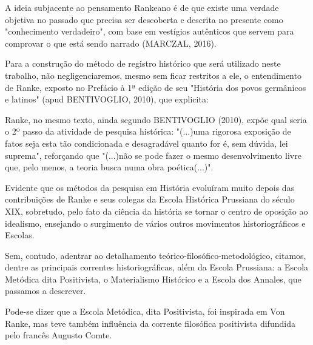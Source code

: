 A ideia subjacente ao pensamento Rankeano é de que existe uma verdade objetiva no passado que precisa ser descoberta e descrita no presente como "conhecimento verdadeiro", com base em vestígios autênticos que servem para comprovar o que está sendo narrado (MARCZAL, 2016).

Para a construção do método de registro histórico que será utilizado neste trabalho, não negligenciaremos, mesmo sem ficar restritos a ele, o entendimento de Ranke, exposto no Prefácio à 1ª edição de seu "História dos povos germânicos e latinos"  (apud BENTIVOGLIO, 2010), que explicita:


\noindent\begin{flushright}\mbox{\linespread{1}\selectfont\centering{}}\end{flushright}


Ranke, no mesmo texto, ainda segundo  BENTIVOGLIO (2010), expõe qual seria o 2º passo da atividade de pesquisa histórica: "(...)uma rigorosa exposição de fatos seja esta tão condicionada e desagradável quanto for é, sem dúvida, lei suprema", reforçando que "(...)não se pode fazer o mesmo desenvolvimento livre que, pelo menos, a teoria busca numa obra poética(...)".

Evidente que os métodos da pesquisa em História evoluíram muito depois das contribuições de Ranke e seus colegas da Escola Histórica Prussiana do século XIX, sobretudo, pelo fato da ciência  da história se tornar o centro de oposição ao idealismo, ensejando o surgimento de vários outros movimentos historiográficos e Escolas.

Sem, contudo, adentrar ao detalhamento teórico-filosófico-metodológico, citamos, dentre as principais correntes historiográficas, além da Escola Prussiana: a Escola Metódica dita Positivista, o Materialismo Histórico e a Escola dos Annales, que passamos a descrever.

Pode-se dizer que a Escola Metódica, dita Positivista, foi inspirada em Von Ranke, mas teve também influência da corrente filosófica positivista difundida pelo francês Augusto Comte.

